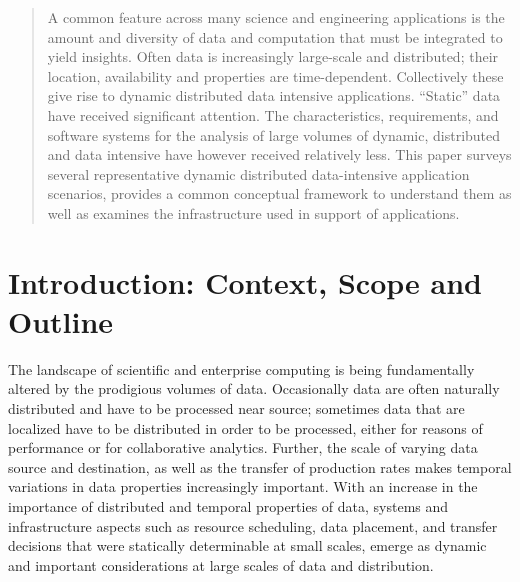 
\begin{abstract}
  A common feature across many science and engineering applications is the
  amount and diversity of data and computation that must be integrated to yield
  insights. Often data is increasingly large-scale and distributed; their
  location, availability and properties are time-dependent. Collectively these
  give rise to dynamic distributed data intensive applications. ``Static'' data
  have received significant attention.  The characteristics, requirements, and
  software systems for the analysis of large volumes of dynamic, distributed and
  data intensive have however received relatively less. This paper surveys
  several representative dynamic distributed data-intensive application
  scenarios, provides a common conceptual framework to understand them as well
  as examines the infrastructure used in support of applications.

\end{abstract}
\maketitle



%

\section{Introduction: Context, Scope and Outline}



The landscape of scientific and enterprise computing is being fundamentally
altered by the prodigious volumes of data.  Occasionally data are often
naturally distributed and have to be processed near source; sometimes data that
are localized have to be distributed in order to be processed, either for
reasons of performance or for collaborative analytics. Further, the scale of
varying data source and destination, as well as the transfer of production rates
makes temporal variations in data properties increasingly important.  With an
increase in the importance of distributed and temporal properties of data,
systems and infrastructure aspects such as resource scheduling, data placement,
and transfer decisions that were statically determinable at small scales, emerge
as dynamic and important considerations at large scales of data and
distribution.


